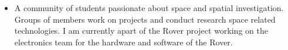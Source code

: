 \documentclass[10pt,a4paper]{altacv}
\begin{document}
%


\begin{itemize}
	\item A community of students passionate about space and spatial investigation. Groups of members work on projects and conduct research space related technologies. I am currently apart of the Rover project working on the electronics team for the hardware and software of the Rover.
\end{itemize}

%
\end{document}
